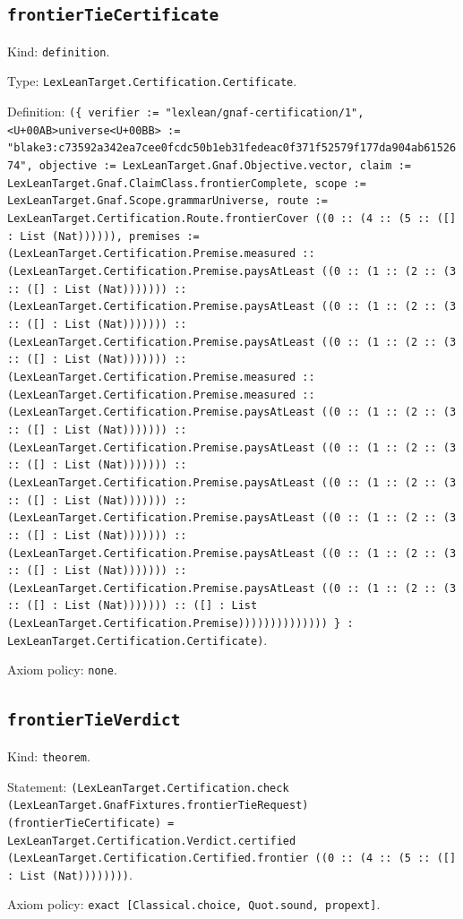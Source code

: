 \documentclass[11pt]{article}
\begin{document}
\subsection*{\texttt{frontierTieCertificate}}
\noindent Kind: \texttt{definition}.\par
\noindent Type: \texttt{LexLeanTarget.Certification.Certificate}.\par
\noindent Definition: \texttt{(\{ verifier := "lexlean/gnaf-certification/1", <U+00AB>universe<U+00BB> := "blake3:c73592a342ea7cee0fcdc50b1eb31fedeac0f371f52579f177da904ab6152674", objective := LexLeanTarget.Gnaf.Objective.vector, claim := LexLeanTarget.Gnaf.ClaimClass.frontierComplete, scope := LexLeanTarget.Gnaf.Scope.grammarUniverse, route := LexLeanTarget.Certification.Route.frontierCover ((0 :: (4 :: (5 :: ([] : List (Nat)))))), premises := (LexLeanTarget.Certification.Premise.measured :: (LexLeanTarget.Certification.Premise.paysAtLeast ((0 :: (1 :: (2 :: (3 :: ([] : List (Nat))))))) :: (LexLeanTarget.Certification.Premise.paysAtLeast ((0 :: (1 :: (2 :: (3 :: ([] : List (Nat))))))) :: (LexLeanTarget.Certification.Premise.paysAtLeast ((0 :: (1 :: (2 :: (3 :: ([] : List (Nat))))))) :: (LexLeanTarget.Certification.Premise.measured :: (LexLeanTarget.Certification.Premise.measured :: (LexLeanTarget.Certification.Premise.paysAtLeast ((0 :: (1 :: (2 :: (3 :: ([] : List (Nat))))))) :: (LexLeanTarget.Certification.Premise.paysAtLeast ((0 :: (1 :: (2 :: (3 :: ([] : List (Nat))))))) :: (LexLeanTarget.Certification.Premise.paysAtLeast ((0 :: (1 :: (2 :: (3 :: ([] : List (Nat))))))) :: (LexLeanTarget.Certification.Premise.paysAtLeast ((0 :: (1 :: (2 :: (3 :: ([] : List (Nat))))))) :: (LexLeanTarget.Certification.Premise.paysAtLeast ((0 :: (1 :: (2 :: (3 :: ([] : List (Nat))))))) :: (LexLeanTarget.Certification.Premise.paysAtLeast ((0 :: (1 :: (2 :: (3 :: ([] : List (Nat))))))) :: ([] : List (LexLeanTarget.Certification.Premise)))))))))))))) \} : LexLeanTarget.Certification.Certificate)}.\par
\noindent Axiom policy: \texttt{none}.\par
\subsection*{\texttt{frontierTieVerdict}}
\noindent Kind: \texttt{theorem}.\par
\noindent Statement: \texttt{(LexLeanTarget.Certification.check (LexLeanTarget.GnafFixtures.frontierTieRequest) (frontierTieCertificate) = LexLeanTarget.Certification.Verdict.certified (LexLeanTarget.Certification.Certified.frontier ((0 :: (4 :: (5 :: ([] : List (Nat))))))))}.\par
\noindent Axiom policy: \texttt{exact [Classical.choice, Quot.sound, propext]}.\par
\end{document}
